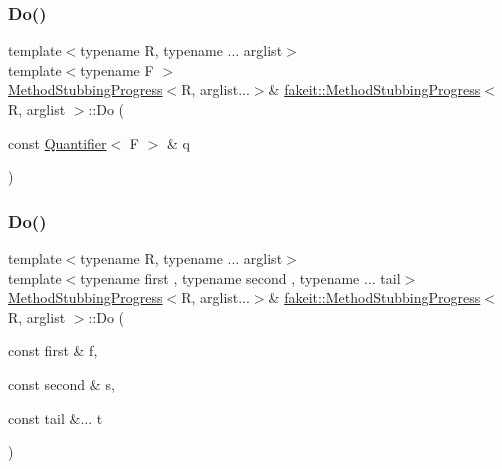 \mbox{\label{structfakeit_1_1MethodStubbingProgress_a59f9d7ab7c86b809ce25b41d05b58ad2}} 
\subsubsection{\texorpdfstring{Do()}{Do()}\hspace{0.1cm}{\footnotesize\ttfamily [19/27]}}
{\footnotesize\ttfamily template$<$typename R, typename ... arglist$>$ \\
template$<$typename F $>$ \\
\mbox{\hyperlink{structfakeit_1_1MethodStubbingProgress}{Method\+Stubbing\+Progress}}$<$R, arglist...$>$\& \mbox{\hyperlink{structfakeit_1_1MethodStubbingProgress}{fakeit\+::\+Method\+Stubbing\+Progress}}$<$ R, arglist $>$\+::Do (\begin{DoxyParamCaption}\item[{const \mbox{\hyperlink{structfakeit_1_1Quantifier}{Quantifier}}$<$ F $>$ \&}]{q }\end{DoxyParamCaption})\hspace{0.3cm}{\ttfamily [inline]}}

\mbox{\label{structfakeit_1_1MethodStubbingProgress_a157561400e37da65c5b48f4466fc603c}} 
\subsubsection{\texorpdfstring{Do()}{Do()}\hspace{0.1cm}{\footnotesize\ttfamily [20/27]}}
{\footnotesize\ttfamily template$<$typename R, typename ... arglist$>$ \\
template$<$typename first , typename second , typename ... tail$>$ \\
\mbox{\hyperlink{structfakeit_1_1MethodStubbingProgress}{Method\+Stubbing\+Progress}}$<$R, arglist...$>$\& \mbox{\hyperlink{structfakeit_1_1MethodStubbingProgress}{fakeit\+::\+Method\+Stubbing\+Progress}}$<$ R, arglist $>$\+::Do (\begin{DoxyParamCaption}\item[{const first \&}]{f,  }\item[{const second \&}]{s,  }\item[{const tail \&...}]{t }\end{DoxyParamCaption})\hspace{0.3cm}{\ttfamily [inline]}}

